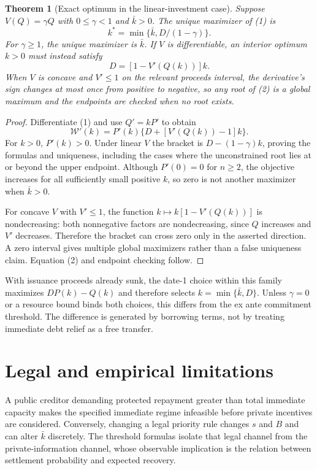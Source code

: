 \documentclass[11pt,a4paper]{article}
\newtheorem{theorem}{Theorem}[section]
\theoremstyle{remark}
\begin{document}
\begin{theorem}[Exact optimum in the linear-investment case]
Suppose $V(Q)=\gamma Q$ with $0\le\gamma<1$ and $\bar k>0$. The unique maximizer of (1) is
\[
 k^*=\min\{\bar k,D/(1-\gamma)\}.
\]
For $\gamma\ge1$, the unique maximizer is $\bar k$. If $V$ is differentiable, an interior optimum $k>0$ must instead satisfy
\[
 D=[1-V'(Q(k))]k. \tag{2}
\]
When $V$ is concave and $V'\le1$ on the relevant proceeds interval, the derivative's sign changes at most once from positive to negative, so any root of (2) is a global maximum and the endpoints are checked when no root exists.
\end{theorem}
\begin{proof}
Differentiate (1) and use $Q'=kP'$ to obtain
\[
 \mathcal W'(k)=P'(k)\{D+[V'(Q(k))-1]k\}.
\]
For $k>0$, $P'(k)>0$. Under linear $V$ the bracket is $D-(1-\gamma)k$, proving the formulas and uniqueness, including the cases where the unconstrained root lies at or beyond the upper endpoint. Although $P'(0)=0$ for $n\ge2$, the objective increases for all sufficiently small positive $k$, so zero is not another maximizer when $\bar k>0$.

For concave $V$ with $V'\le1$, the function $k\mapsto k[1-V'(Q(k))]$ is nondecreasing: both nonnegative factors are nondecreasing, since $Q$ increases and $V'$ decreases. Therefore the bracket can cross zero only in the asserted direction. A zero interval gives multiple global maximizers rather than a false uniqueness claim. Equation (2) and endpoint checking follow.
\end{proof}

With issuance proceeds already sunk, the date-1 choice within this family maximizes $DP(k)-Q(k)$ and therefore selects $k=\min\{\bar k,D\}$. Unless $\gamma=0$ or a resource bound binds both choices, this differs from the ex ante commitment threshold. The difference is generated by borrowing terms, not by treating immediate debt relief as a free transfer.

\section{Legal and empirical limitations}
A public creditor demanding protected repayment greater than total immediate capacity makes the specified immediate regime infeasible before private incentives are considered. Conversely, changing a legal priority rule changes $s$ and $B$ and can alter $\bar k$ discretely. The threshold formulas isolate that legal channel from the private-information channel, whose observable implication is the relation between settlement probability and expected recovery.
\end{document}
